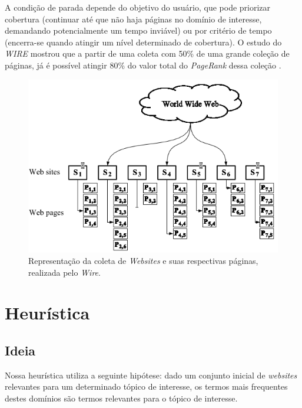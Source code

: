 \documentclass[a4paper,12pt,titlepage]{article}
\begin{document}
A condição de parada depende do objetivo do usuário, que pode priorizar cobertura (continuar até que não haja páginas no domínio de interesse, demandando potencialmente um tempo inviável) ou por critério de tempo (encerra-se quando atingir um nível determinado de cobertura). O estudo do \textit{WIRE} mostrou que a partir de uma coleta com 50\% de uma grande coleção de páginas, já é possível atingir 80\% do valor total do \textit{PageRank} dessa coleção \cite{carlos}.

\begin{figure}[H]
     \centering
     \includegraphics[scale=0.5]{figures/harvester.png}
     \caption{Representação da coleta de \textit{Websites} e suas respectivas páginas, realizada pelo \textit{Wire}.}
     \label{bsp}
\end{figure}


\section{Heurística}

\subsection{Ideia}

Nossa heurística utiliza a seguinte hipótese: dado um conjunto inicial de \textit{websites} relevantes para um determinado tópico de interesse, os termos mais frequentes destes domínios são termos relevantes para o tópico de interesse. 
\end{document}
